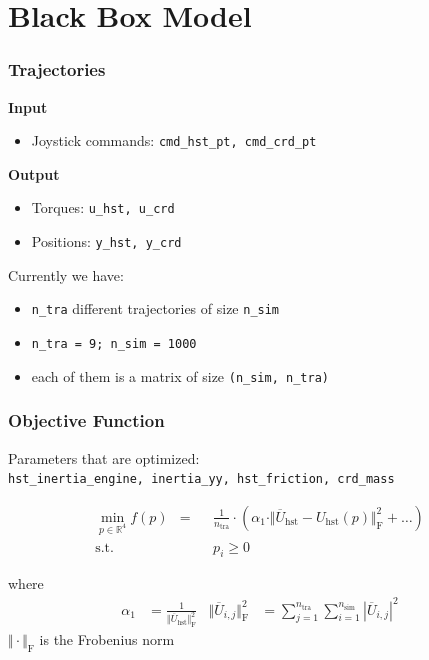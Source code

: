\documentclass{beamer}
\begin{document}
\section{Black Box Model}

\begin{frame}
	\frametitle{Trajectories}
	
	\textbf{Input}
	\begin{itemize}
		\item{Joystick commands: \lstinline{cmd_hst_pt, cmd_crd_pt}}
	\end{itemize}
	
	\vspace{0.5cm}
	
	\textbf{Output}
	\begin{itemize}
		\item{Torques: \lstinline{u_hst, u_crd}}
		\item{Positions: \lstinline{y_hst, y_crd}}
	\end{itemize}

	\vspace{0.5cm}

	Currently we have:
	\begin{itemize}
		\item{\lstinline{n_tra} different trajectories of size \lstinline{n_sim}}
		\item{\lstinline{n_tra = 9; n_sim = 1000}}
		\item{each of them is a matrix of size \lstinline{(n_sim, n_tra)}}	
	\end{itemize}
\end{frame}

\begin{frame}
	\frametitle{Objective Function}
	Parameters that are optimized: \\
	\lstinline{hst_inertia_engine, inertia_yy, hst_friction, crd_mass}
	
	\begin{align*}
		\min_{p\in\mathbb{R}^4} f(p)& = & & \frac{1}{n_{\operatorname{tra}}}
		\cdot\left(\alpha_1\cdot \Vert \overline{U}_{\operatorname{hst}} - U_{\operatorname{hst}}\left(p\right) \Vert_{\operatorname{F}}^2 + \dots \right) \\
		\operatorname{s.t.} & & & p_i \geq 0
	\end{align*}
	
	where
	\begin{align*}
		\alpha_1 & = \frac{1}{\Vert\overline{U}_{\operatorname{hst}}\Vert_{\operatorname{F}}^2} &
		\Vert\overline{U}_{i,j}\Vert_{\operatorname{F}}^2 & = \sum_{j=1}^{n_{\operatorname{tra}}}\sum_{i=1}^{n_{\operatorname{sim}}}|\overline{U}_{i,j}|^2
	\end{align*}
	$\Vert\cdot\Vert_{\operatorname{F}}$ is the Frobenius norm
\end{frame}
\end{document}
